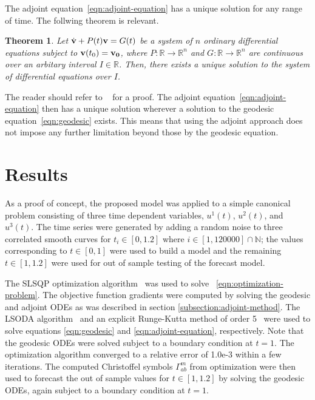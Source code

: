 \documentclass[a4paper,11pt]{elsarticle}
\newtheorem{theorem}{Theorem}
\begin{document}
The adjoint equation~\ref{eqn:adjoint-equation} has a unique solution
for any range of time. The follwing theorem is relevant.

\begin{theorem}
  Let $\dot{\bold{v}} + P(t) \bold{v} = G(t)$ be a system of $n$
  ordinary differential equations subject to $\bold{v}(t_{0}) =
  \bold{v_{0}}$, where $P: \mathbb{R} \to \mathbb{R}^{n}$ and $G:
  \mathbb{R} \to \mathbb{R}^{n}$ are continuous over an arbitary
  interval $I \in \mathbb{R}$. Then, there exists a unique solution to
  the system of differential equations over $I$.
\end{theorem}

The reader should refer to ~\cite{boyes-1990} for a proof. The adjoint
equation~\ref{eqn:adjoint-equation} then has a unique solution
wherever a solution to the geodesic equation~\ref{eqn:geodesic}
exists. This means that using the adjoint approach does not impose any
further limitation beyond those by the geodesic equation.

\section{Results}\label{section:results}

As a proof of concept, the proposed model was applied to a simple
canonical problem consisting of three time dependent variables,
$u^{1}(t)$, $u^{2}(t)$, and $u^{3}(t)$. The time series were generated
by adding a random noise to three correlated smooth curves for $t_{i}
\in [0,1.2]$ where $i \in [1,120000] \cap \mathbb{N}$; the values
corresponding to $t \in [0,1]$ were used to build a model and the
remaining $t \in [1,1.2]$ were used for out of sample testing of the
forecast model.

The SLSQP optimization algorithm~\cite{numerical-optimization-2006}
was used to solve ~\ref{eqn:optimization-problem}. The objective
function gradients were computed by solving the geodesic and adjoint
ODEs as was described in section \ref{subsection:adjoint-method}. The
LSODA algorithm~\cite{petzold-1983} and an explicit Runge-Kutta method
of order 5~\cite{dormand-prince-1980} were used to solve equations
\ref{eqn:geodesic} and \ref{eqn:adjoint-equation}, respectively. Note
that the geodesic ODEs were solved subject to a boundary condition at
$t = 1$. The optimization algorithm converged to a relative error of
1.0e-3 within a few iterations. The computed Christoffel symbols
$\Gamma^{m}_{ab}$ from optimization were then used to forecast the out
of sample values for $t \in [1,1.2]$ by solving the geodesic ODEs,
again subject to a boundary condition at $t = 1$.
\end{document}
